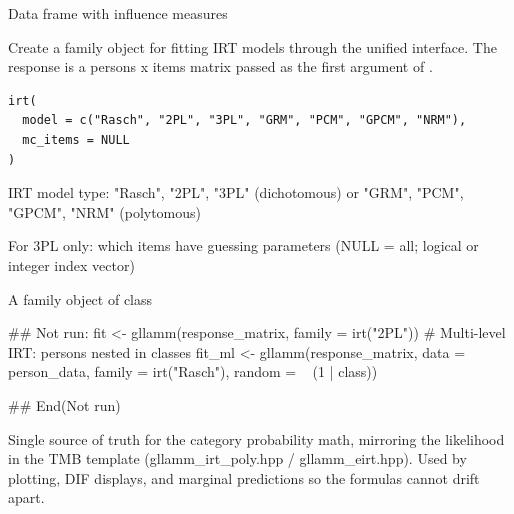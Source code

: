 \documentclass[a4paper]{book}
\begin{document}
%
\begin{Value}
Data frame with influence measures
\end{Value}
%
\begin{Description}
Create a family object for fitting IRT models through the unified
 interface. The response is a persons x items matrix
passed as the first argument of .
\end{Description}
%
\begin{Usage}
\begin{verbatim}
irt(
  model = c("Rasch", "2PL", "3PL", "GRM", "PCM", "GPCM", "NRM"),
  mc_items = NULL
)
\end{verbatim}
\end{Usage}
%
\begin{Arguments}
\begin{ldescription}
\item[\code{model}] IRT model type: "Rasch", "2PL", "3PL" (dichotomous) or
"GRM", "PCM", "GPCM", "NRM" (polytomous)

\item[\code{mc\_items}] For 3PL only: which items have guessing parameters
(NULL = all; logical or integer index vector)
\end{ldescription}
\end{Arguments}
%
\begin{Value}
A family object of class 
\end{Value}
%
\begin{Examples}
\begin{ExampleCode}
## Not run: 
fit <- gllamm(response_matrix, family = irt("2PL"))
# Multi-level IRT: persons nested in classes
fit_ml <- gllamm(response_matrix, data = person_data,
                 family = irt("Rasch"), random = ~ (1 | class))

## End(Not run)

\end{ExampleCode}
\end{Examples}
%
\begin{Description}
Single source of truth for the category probability math, mirroring the
likelihood in the TMB template (gllamm\_irt\_poly.hpp / gllamm\_eirt.hpp).
Used by plotting, DIF displays, and marginal predictions so the formulas
cannot drift apart.
\end{Description}
\end{document}
